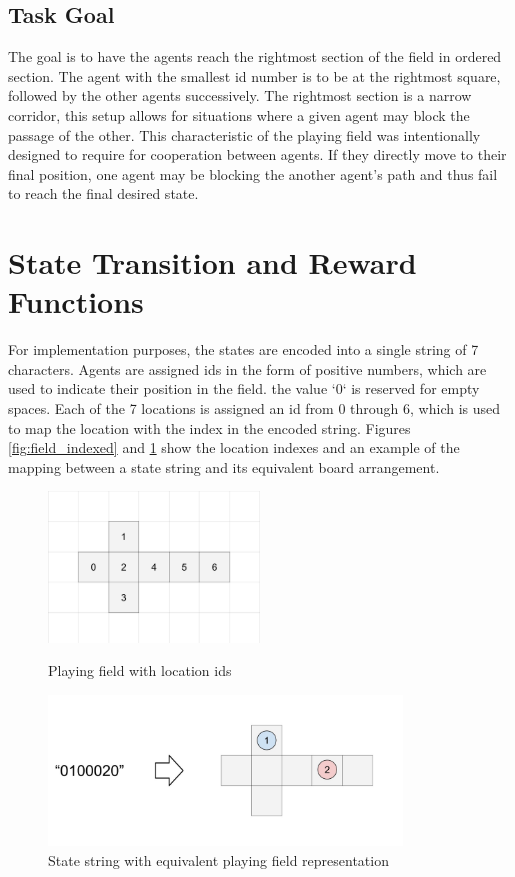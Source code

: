 \documentclass[11pt]{article}
\begin{document}
\subsection{Task Goal}
    The goal is to have the agents reach the rightmost section of the field in ordered section. The agent with the smallest id number is to be at the rightmost square, followed by the other agents successively. The rightmost section is a narrow corridor, this setup allows for situations where a given agent may block the passage of the other. This characteristic of the playing field was intentionally designed to require for cooperation between agents. If they directly move to their final position, one agent may be blocking the another agent's path and thus fail to reach the final desired state.



\section{State Transition and Reward Functions} \label{sec:transition}
    For implementation purposes, the states are encoded into a single string of 7 characters. Agents are assigned ids in the form of positive numbers, which are used to indicate their position in the field. the value `0` is reserved for empty spaces. Each of the 7 locations is assigned an id from 0 through 6, which is used to map the location with the index in the encoded string. Figures \ref{fig:field_indexed} and \ref{fig:field_mapping} show the location indexes and an example of the mapping between a state string and its equivalent board arrangement.


    \begin{figure}[h]
        \centering
        \includegraphics[height=4cm]{./Images/2_Playing_Field_Indexed.jpg}
        \caption{Playing field with location ids}
        \label{fig:field_indexed}

        \includegraphics[height=4cm]{./Images/3_Playing_Field_Encoding.jpg}
        \caption{State string with equivalent playing field representation}
        \label{fig:field_mapping}
    \end{figure}
\end{document}
